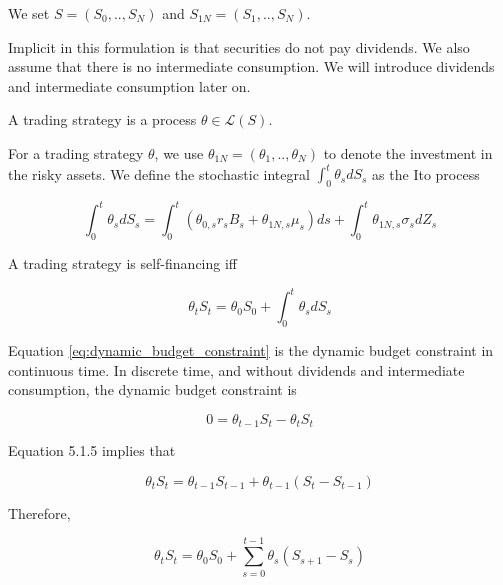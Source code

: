 \documentclass[\topdir/lecture\_notes.tex]{subfiles}
\begin{document}
We set $S=\left(S_{0}, . ., S_{N}\right)$ and $S_{1 N}=\left(S_{1}, . ., S_{N}\right)$.

Implicit in this formulation is that securities do not pay dividends. We also assume that there is no intermediate consumption. We will introduce dividends and intermediate consumption later on.

\begin{defn}\label{def:trading_strategy}
A trading strategy is a process $\theta \in \mathcal{L}(S)$.
\end{defn}

For a trading strategy $\theta$, we use $\theta_{1 N}=\left(\theta_{1}, . ., \theta_{N}\right)$ to denote the investment in the risky assets. We define the stochastic integral $\int_{0}^{t} \theta_{s} d S_{s}$ as the Ito process

\begin{equation*}
\int_{0}^{t} \theta_{s} d S_{s}=\int_{0}^{t}\left(\theta_{0, s} r_{s} B_{s}+\theta_{1 N, s} \mu_{s}\right) d s+\int_{0}^{t} \theta_{1 N, s} \sigma_{s} d Z_{s}
\end{equation*}

\begin{defn}\label{def:self_financing}
A trading strategy is self-financing iff

\begin{equation}
\theta_{t} S_{t}=\theta_{0} S_{0}+\int_{0}^{t} \theta_{s} d S_{s} \label{eq:dynamic_budget_constraint}
\end{equation}

\end{defn}

Equation \eqref{eq:dynamic_budget_constraint} is the dynamic budget constraint in continuous time. In discrete time, and without dividends and intermediate consumption, the dynamic budget constraint is

\begin{equation*}
0=\theta_{t-1} S_{t}-\theta_{t} S_{t}
\end{equation*}

Equation 5.1.5 implies that

\begin{equation*}
\theta_{t} S_{t}=\theta_{t-1} S_{t-1}+\theta_{t-1}\left(S_{t}-S_{t-1}\right)
\end{equation*}

Therefore,

\begin{equation*}
\theta_{t} S_{t}=\theta_{0} S_{0}+\sum_{s=0}^{t-1} \theta_{s}\left(S_{s+1}-S_{s}\right)
\end{equation*}
\end{document}
